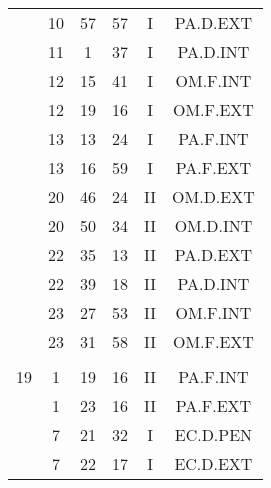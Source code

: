 \documentclass[12pt, a4paper]{article}
\begin{document}
\begin{multicols}{3}
{\begin{tabular}{c c c c c c}
	 	 	 	 & 10 & 57 & 57 & I & PA.D.EXT\\%
	 	 	 	 & 11 & 1 & 37 & I & PA.D.INT\\%
	 	 	 	 & 12 & 15 & 41 & I & OM.F.INT\\%
	 	 	 	 & 12 & 19 & 16 & I & OM.F.EXT\\%
	 	 	 	 & 13 & 13 & 24 & I & PA.F.INT\\%
	 	 	 	 & 13 & 16 & 59 & I & PA.F.EXT\\%
	 	 	 	 & 20 & 46 & 24 & II & OM.D.EXT\\%
	 	 	 	 & 20 & 50 & 34 & II & OM.D.INT\\%
	 	 	 	 & 22 & 35 & 13 & II & PA.D.EXT\\%
	 	 	 	 & 22 & 39 & 18 & II & PA.D.INT\\%
	 	 	 	 & 23 & 27 & 53 & II & OM.F.INT\\%
	 	 	 	 & 23 & 31 & 58 & II & OM.F.EXT\\%
	 	 	 	 & & & & & \\%
	 	 	 	19 & 1 & 19 & 16 & II & PA.F.INT\\%
	 	 	 	 & 1 & 23 & 16 & II & PA.F.EXT\\%
	 	 	 	 & 7 & 21 & 32 & I & EC.D.PEN\\%
	 	 	 	 & 7 & 22 & 17 & I & EC.D.EXT\\%
	 	 \end{tabular}
 	}
\end{multicols}
\end{document}
